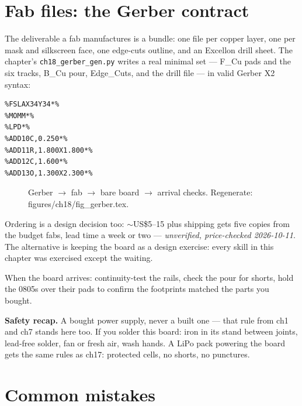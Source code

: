 \section{Fab files: the Gerber contract}\label{sec:gerber18}

The deliverable a fab manufactures is a bundle: one file per copper
layer, one per mask and silkscreen face, one edge-cuts outline, and
an Excellon drill sheet. The chapter's \texttt{ch18\_gerber\_gen.py}
writes a real minimal set --- F\_Cu pads and the six tracks, B\_Cu
pour, Edge\_Cuts, and the drill file --- in valid Gerber X2 syntax:

\begin{lstlisting}[caption={\ttfamily ch18\_sensor-F\_Cu.gbr head ---
the header a Gerber viewer reads first.}]
%TF.FileFunction,Copper,L1,Top*%
%FSLAX34Y34*%
%MOMM*%
%LPD*%
%ADD10C,0.250*%
%ADD11R,1.800X1.800*%
%ADD12C,1.600*%
%ADD13O,1.300X2.300*%
\end{lstlisting}

\begin{figure}[htbp]
\centering

\caption{Gerber $\to$ fab $\to$ bare board $\to$ arrival checks.
Regenerate: \ttfamily figures/ch18/fig\_gerber.tex.}
\label{fig:gerber18}
\end{figure}

Ordering is a design decision too: $\sim$US\$5--15 plus shipping
gets five copies from the budget fabs, lead time a week or two ---
\emph{unverified, price-checked 2026-10-11}. The alternative is
keeping the board as a design exercise: every skill in this chapter
was exercised except the waiting.

When the board arrives: continuity-test the rails, check the pour
for shorts, hold the 0805s over their pads to confirm the footprints
matched the parts you bought.

\textbf{Safety recap.} A bought power supply, never a built one ---
that rule from ch1 and ch7 stands here too. If you solder this
board: iron in its stand between joints, lead-free solder, fan or
fresh air, wash hands. A LiPo pack powering the board gets the same
rules as ch17: protected cells, no shorts, no punctures.

\section{Common mistakes}\label{sec:cm18}

